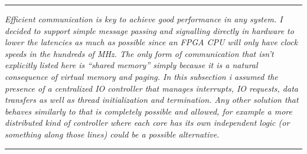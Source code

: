     \par\noindent\rule{\textwidth}{0.4pt}
    \textit{Efficient communication is key to achieve good performance in any system. I decided to support simple message passing and signalling directly in hardware to lower the latencies as much as possible since an FPGA CPU will only have clock speeds in the hundreds of MHz. The only form of communication that isn't explicitly listed here is ``shared memory'' simply because it is a natural consequence of virtual memory and paging. In this subsection i assumed the presence of a centralized IO controller that manages interrupts, IO requests, data transfers as well as thread initialization and termination. Any other solution that behaves similarly to that is completely possible and allowed, for example a more distributed kind of controller where each core has its own independent logic (or something along those lines) could be a possible alternative.}
    \par\noindent\rule{\textwidth}{0.4pt}